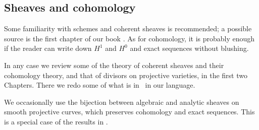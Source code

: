 \subsection {Sheaves and cohomology} 

Some familiarity with schemes and coherent sheaves is recommended; a possible source is
the first chapter of our book \cite{GeomSchemes}.
As for cohomology, it is probably enough if the reader can write down $H^1$ and $H^0$ and exact sequences without blushing.

In any case we review some of the theory of coherent sheaves and their cohomology theory, and that of divisors on projective 
varieties, in the first two Chapters. There we redo some of what is in~\cite[Chapter IV]{Hartshorne1977}  in our language. 

We occasionally use the bijection between algebraic and analytic sheaves on smooth projective curves, which preserves
cohomology and exact sequences. This is a special case of the results in \cite{GAGA}. 





%
%
%




